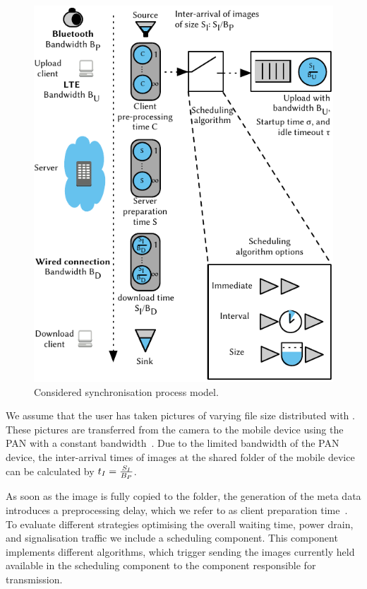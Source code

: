\begin{figure}
\centering
\includegraphics[width=\columnwidth]{application/cloud_file_synchronization/system_model/figures/model}
\caption{Considered synchronisation process model.}
\label{fig:application:cloud_file_synchronisation:system_model:model_metrics:model}
\end{figure}

We assume that the user has taken pictures of varying file size distributed with \imageFileSize.
These pictures are transferred from the camera to the mobile device using the \gls{PAN} with a constant bandwidth~\panTransferRate.
Due to the limited bandwidth \panTransferRate of the \gls{PAN} device, the inter-arrival times of images at the \dropbox shared folder of the mobile device can be calculated by \(t_I = \frac{S_I}{B_{P}}\).

As soon as the image is fully copied to the \dropbox folder, the generation of the meta data introduces a preprocessing delay, which we refer to as client preparation time~\clientpreparationtime.
To evaluate different strategies optimising the overall waiting time, power drain, and signalisation traffic we include a scheduling component.
This component implements different algorithms, which trigger sending the images currently held available in the scheduling component to the component responsible for transmission.

